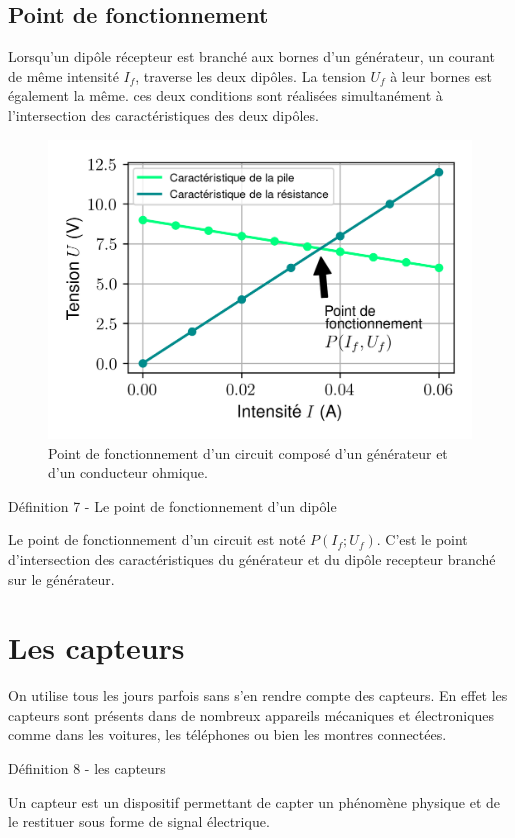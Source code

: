 \documentclass[french, a4paper, 12pt]{article}
\begin{document}
\subsection{Point de fonctionnement}

Lorsqu'un dipôle récepteur est branché aux bornes d'un générateur, un courant de même intensité $I_f$, traverse les deux dipôles. La tension $U_f$ à leur bornes est également la même. ces deux conditions sont réalisées simultanément à l'intersection des caractéristiques des deux dipôles. 

\begin{figure}[ht]
	\centering
	\includegraphics[width=.6\textwidth]{PointDeFonctionnement.png}
	\caption{Point de fonctionnement d'un circuit composé d'un générateur et d'un conducteur ohmique.}
\end{figure}

\begin{definition}{Définition 7 - Le point de fonctionnement d'un dipôle}

	Le point de fonctionnement d'un circuit est noté $P(I_f; U_f)$. C'est le point d'intersection des caractéristiques du générateur et du dipôle recepteur branché sur le générateur. 

\end{definition}

\section{Les capteurs}

On utilise tous les jours parfois sans s'en rendre compte des capteurs. En effet les capteurs sont présents dans de nombreux appareils mécaniques et électroniques comme dans les voitures, les téléphones ou bien les montres connectées.\medskip

\begin{definition}{Définition 8 - les capteurs}

	Un capteur est un dispositif permettant de capter un phénomène physique et de le restituer sous forme de signal électrique. 
	
\end{definition}
\end{document}

